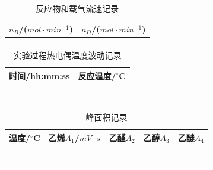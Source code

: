 \documentclass[a4paper]{article}
\begin{document}
\begin{table}[H]
	\begin{center}
		\begin{tabular}{l|l}
			\hline
			$n_{B}$/($mol\cdot min^{-1}$) & $n_{D}$/($mol\cdot min^{-1}$)\\
			\hline
			                              &                              \\
			\hline
		 \end{tabular}
	\end{center}
	\caption{反应物和载气流速记录}
\end{table}

\begin{table}[H]
	\begin{center}
		\begin{tabular}{l|l}
			\hline
			时间/hh:mm:ss &反应温度/$^\circ$C\\
			\hline
						  &                  \\
			\hline
						  &                  \\
			\hline
						  &                  \\
			\hline
						  &                  \\
			\hline
						  &                  \\
			\hline
						  &                  \\
			\hline
		 \end{tabular}
	\end{center}
	\caption{实验过程热电偶温度波动记录}
\end{table}

\begin{table}[H]
	\begin{center}
		\begin{tabular}{l|l|l|l|l}
			\hline
			温度/$^\circ$C &乙烯$A_{1}$/$mV\cdot s$    &乙醛$A_{2}$        &乙醇$A_{3}$     &乙醚$A_{4}$\\ 
			\hline
			&             &          &             & \\
			\hline
			&             &          &             & \\
			\hline
			&             &          &             & \\
			\hline
			&             &          &             & \\
			\hline
			&             &          &             & \\
			\hline
			&             &          &             & \\
			\hline
		 \end{tabular}
	\end{center}
	\caption{峰面积记录}
\end{table}
\end{document}
